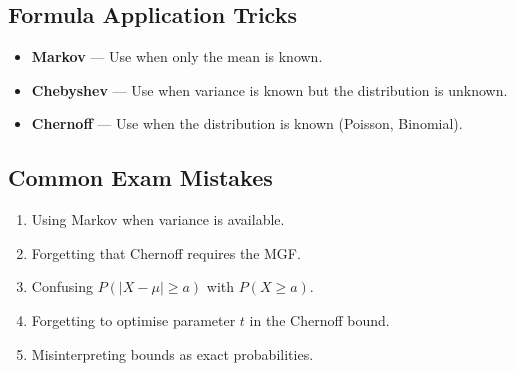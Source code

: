 \documentclass[12pt, a4paper]{article}
\begin{document}
\subsection*{Formula Application Tricks}

\begin{itemize}[leftmargin=2em]
  \item \textbf{Markov} --- Use when only the mean is known.
  \item \textbf{Chebyshev} --- Use when variance is known but the distribution is unknown.
  \item \textbf{Chernoff} --- Use when the distribution is known (Poisson, Binomial).
\end{itemize}

\subsection*{Common Exam Mistakes}

\begin{enumerate}[leftmargin=2em]
  \item Using Markov when variance is available.
  \item Forgetting that Chernoff requires the MGF.
  \item Confusing $P(|X - \mu| \geq a)$ with $P(X \geq a)$.
  \item Forgetting to optimise parameter $t$ in the Chernoff bound.
  \item Misinterpreting bounds as exact probabilities.
\end{enumerate}
\end{document}
